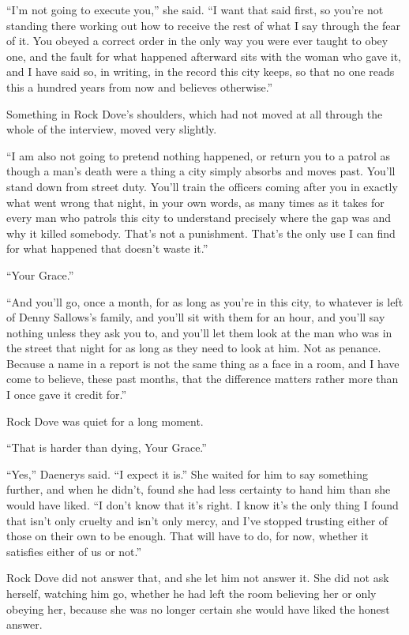“I’m not going to execute you,” she said. “I want that said first, so you’re not standing there working out how to receive the rest of what I say through the fear of it. You obeyed a correct order in the only way you were ever taught to obey one, and the fault for what happened afterward sits with the woman who gave it, and I have said so, in writing, in the record this city keeps, so that no one reads this a hundred years from now and believes otherwise.”

Something in Rock Dove’s shoulders, which had not moved at all through the whole of the interview, moved very slightly.

“I am also not going to pretend nothing happened, or return you to a patrol as though a man’s death were a thing a city simply absorbs and moves past. You’ll stand down from street duty. You’ll train the officers coming after you in exactly what went wrong that night, in your own words, as many times as it takes for every man who patrols this city to understand precisely where the gap was and why it killed somebody. That’s not a punishment. That’s the only use I can find for what happened that doesn’t waste it.”

“Your Grace.”

“And you’ll go, once a month, for as long as you’re in this city, to whatever is left of Denny Sallows’s family, and you’ll sit with them for an hour, and you’ll say nothing unless they ask you to, and you’ll let them look at the man who was in the street that night for as long as they need to look at him. Not as penance. Because a name in a report is not the same thing as a face in a room, and I have come to believe, these past months, that the difference matters rather more than I once gave it credit for.”

Rock Dove was quiet for a long moment.

“That is harder than dying, Your Grace.”

“Yes,” Daenerys said. “I expect it is.” She waited for him to say something further, and when he didn’t, found she had less certainty to hand him than she would have liked. “I don’t know that it’s right. I know it’s the only thing I found that isn’t only cruelty and isn’t only mercy, and I’ve stopped trusting either of those on their own to be enough. That will have to do, for now, whether it satisfies either of us or not.”

Rock Dove did not answer that, and she let him not answer it. She did not ask herself, watching him go, whether he had left the room believing her or only obeying her, because she was no longer certain she would have liked the honest answer.

